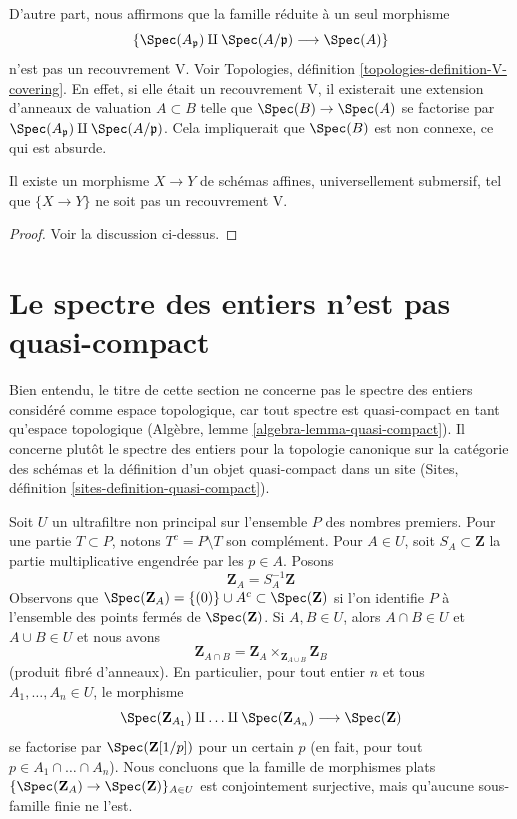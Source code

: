 \medskip\noindent
D'autre part, nous affirmons que la famille réduite à un seul morphisme
$$
\{\Spec(A_\mathfrak p) \amalg \Spec(A/\mathfrak p) \longrightarrow \Spec(A)\}
$$
n'est pas un recouvrement V. Voir
Topologies, définition \ref{topologies-definition-V-covering}.
En effet, si elle était un recouvrement V, il existerait une extension
d'anneaux de valuation $A \subset B$ telle que
$\Spec(B) \to \Spec(A)$ se factorise par
$\Spec(A_\mathfrak p) \amalg \Spec(A/\mathfrak p)$.
Cela impliquerait que $\Spec(B)$ est non connexe, ce qui est absurde.

\begin{lemma}
\label{lemma-universally-submersive-not-V}
Il existe un morphisme $X \to Y$ de schémas affines,
universellement submersif, tel que $\{X \to Y\}$
ne soit pas un recouvrement V.
\end{lemma}

\begin{proof}
Voir la discussion ci-dessus.
\end{proof}









\section{Le spectre des entiers n'est pas quasi-compact}
\label{section-canonical}

\noindent
Bien entendu, le titre de cette section ne concerne pas le spectre des entiers
considéré comme espace topologique, car tout spectre est quasi-compact
en tant qu'espace topologique
(Algèbre, lemme \ref{algebra-lemma-quasi-compact}).
Il concerne plutôt le spectre des entiers pour la topologie canonique
sur la catégorie des schémas et la définition d'un objet quasi-compact
dans un site
(Sites, définition \ref{sites-definition-quasi-compact}).

\medskip\noindent
Soit $U$ un ultrafiltre non principal sur l'ensemble $P$ des nombres premiers.
Pour une partie $T \subset P$, notons $T^c = P \setminus T$ son complément.
Pour $A \in U$, soit $S_A \subset \mathbf{Z}$ la partie multiplicative
engendrée par les $p \in A$. Posons
$$
\mathbf{Z}_A = S_A^{-1}\mathbf{Z}
$$
Observons que $\Spec(\mathbf{Z}_A) = \{(0)\} \cup A^c \subset \Spec(\mathbf{Z})$
si l'on identifie $P$ à l'ensemble des points fermés de $\Spec(\mathbf{Z})$.
Si $A, B \in U$, alors $A \cap B \in U$ et $A \cup B \in U$
et nous avons
$$
\mathbf{Z}_{A \cap B} =
\mathbf{Z}_A \times_{\mathbf{Z}_{A \cup B}} \mathbf{Z}_B
$$
(produit fibré d'anneaux). En particulier, pour tout
entier $n$ et tous $A_1, \ldots, A_n \in U$, le morphisme
$$
\Spec(\mathbf{Z}_{A_1}) \amalg \ldots \amalg \Spec(\mathbf{Z}_{A_n})
\longrightarrow \Spec(\mathbf{Z})
$$
se factorise par $\Spec(\mathbf{Z}[1/p])$ pour un certain $p$
(en fait, pour tout $p \in A_1 \cap \ldots \cap A_n$).
Nous concluons que la famille de morphismes plats
$\{\Spec(\mathbf{Z}_A) \to \Spec(\mathbf{Z})\}_{A \in U}$
est conjointement surjective, mais qu'aucune sous-famille finie ne l'est.

